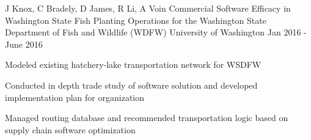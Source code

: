

\begin{cventries}

  \cventry
    {J Knox, C Bradely, D James, R Li, A Voin} %
    {Commercial Software Efficacy in Washington State Fish Planting Operations for the Washington State Department of Fish and Wildlife (WDFW)} %
    {University of Washington} %
    {Jan 2016 - June 2016} %
    {
      \begin{cvitems} %
        \item {Modeled existing hatchery-lake transportation network for WSDFW}
        \item {Conducted in depth trade study of software solution and developed implementation plan for organization}
        \item {Managed routing database and recommended transportation logic based on supply chain software optimization}
      \end{cvitems}
    }




\end{cventries}

